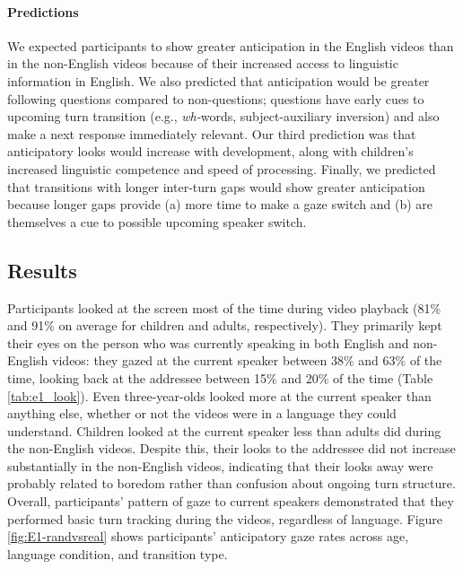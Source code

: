 \documentclass[authoryear, 12pt]{elsarticle}
\begin{document}
\paragraph{Predictions}
We expected participants to show greater anticipation in the English videos than in the non-English videos because of their increased access to linguistic information in English. We also predicted that anticipation would be greater following questions compared to non-questions; questions have early cues to upcoming turn transition (e.g., \textit{wh-}words, subject-auxiliary inversion) and also make a next response immediately relevant. Our third prediction was that anticipatory looks would increase with development, along with children's increased linguistic competence and speed of processing. Finally, we predicted that transitions with longer inter-turn gaps would show greater anticipation because longer gaps provide (a) more time to make a gaze switch and (b) are themselves a cue to possible upcoming speaker switch.

\subsection*{Results}
\label{sec:results1}

Participants looked at the screen most of the time during video playback (81\% and 91\% on average for children and adults, respectively). They primarily kept their eyes on the person who was currently speaking in both English and non-English videos: they gazed at the current speaker between 38\% and 63\% of the time, looking back at the addressee between 15\% and 20\% of the time (Table \ref{tab:e1_look}). Even three-year-olds looked more at the current speaker than anything else, whether or not the videos were in a language they could understand. Children looked at the current speaker less than adults did during the non-English videos. Despite this, their looks to the addressee did not increase substantially in the non-English videos, indicating that their looks away were probably related to boredom rather than confusion about ongoing turn structure. Overall, participants' pattern of gaze to current speakers demonstrated that they performed basic turn tracking during the videos, regardless of language. Figure \ref{fig:E1-randvsreal} shows participants' anticipatory gaze rates across age, language condition, and transition type.
\end{document}
